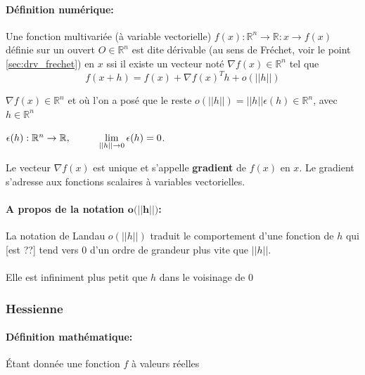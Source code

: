 		\paragraph*{Définition numérique:}
		Une fonction multivariée (à variable vectorielle)
		$ f(x)	: \mathbb{R}^n \rightarrow \mathbb{R} : x \rightarrow f(x) $ définie sur un ouvert $O \in \mathbb{R}^n$ est dite dérivable (au sens de Fréchet, voir le point \ref{sec:drv_frechet}) en $x$ ssi il existe un vecteur noté $\nabla f(x) \in \mathbb{R}^n$ tel que
		\begin{equation}
			f(x+h) = f(x) + \nabla f(x)^{T}h + o(||h||)
		\end{equation}
		
		$\nabla f(x) \in \mathbb{R}^n$ et où l’on a posé que le reste $o(||h||) = ||h||\epsilon (h) \in \mathbb{R}^n$, avec $h \in \mathbb{R}^n$ 
		\begin{center}
			$\epsilon (h): \mathbb{R}^n\rightarrow \mathbb{R}, \hspace{1 cm} \lim\limits_{||h|| \rightarrow 0} \epsilon(h)=0$.
		\end{center} 
		Le vecteur $\nabla f(x)$ est unique et s’appelle \textbf{gradient} de $f(x)$ en $x$.
		Le gradient s’adresse aux fonctions scalaires à variables vectorielles.
		\paragraph*{A propos de la notation $\textbf{o(||h||)}$:}
		La notation de Landau $o(||h||)$ traduit le comportement d’une fonction de $h$ qui [est ??] tend vers $0$ d’un ordre de grandeur plus vite que $||h||$.\\\\
		Elle est infiniment plus petit que $h$ dans le voisinage de $0$
		
		
		
			
	\subsubsection{Hessienne}
	\paragraph*{Définition mathématique:}
	Étant donnée une fonction ${f}$ à valeurs réelles
	
